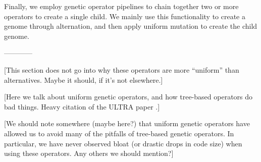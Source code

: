 Finally, we employ genetic operator pipelines to chain together two or more operators to create a single child. We mainly use this functionality to create a genome through alternation, and then apply uniform mutation to create the child genome.

------------

[This section does not go into why these operators are more ``uniform'' than alternatives. Maybe it should, if it's not elsewhere.]

[Here we talk about uniform genetic operators, and how tree-based operators do bad things. Heavy citation of the ULTRA paper \citep{Spector:2013:GPTP}.]

[We should note somewhere (maybe here?) that uniform genetic operators have allowed us to avoid many of the pitfalls of tree-based genetic operators. In particular, we have never observed bloat (or drastic drops in code size) when using these operators. Any others we should mention?]





